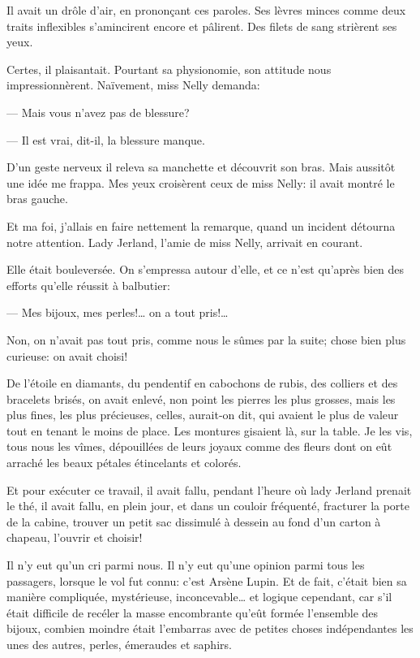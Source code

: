 \documentclass[12pt,a4paper]{article}
\begin{document}
Il avait un drôle d’air, en prononçant ces paroles. Ses lèvres minces comme deux traits inflexibles s’amincirent encore et pâlirent. Des filets de sang strièrent ses yeux.

Certes, il plaisantait. Pourtant sa physionomie, son attitude nous impressionnèrent. Naïvement, miss Nelly demanda:

— Mais vous n’avez pas de blessure?

— Il est vrai, dit-il, la blessure manque.

D’un geste nerveux il releva sa manchette et découvrit son bras. Mais aussitôt une idée me frappa. Mes yeux croisèrent ceux de miss Nelly: il avait montré le bras gauche.

Et ma foi, j’allais en faire nettement la remarque, quand un incident détourna notre attention. Lady Jerland, l’amie de miss Nelly, arrivait en courant.

Elle était bouleversée. On s’empressa autour d’elle, et ce n’est qu’après bien des efforts qu’elle réussit à balbutier:

— Mes bijoux, mes perles!… on a tout pris!…

Non, on n’avait pas tout pris, comme nous le sûmes par la suite; chose bien plus curieuse: on avait choisi!

De l’étoile en diamants, du pendentif en cabochons de rubis, des colliers et des bracelets brisés, on avait enlevé, non point les pierres les plus grosses, mais les plus fines, les plus précieuses, celles, aurait-on dit, qui avaient le plus de valeur tout en tenant le moins de place. Les montures gisaient là, sur la table. Je les vis, tous nous les vîmes, dépouillées de leurs joyaux comme des fleurs dont on eût arraché les beaux pétales étincelants et colorés.

Et pour exécuter ce travail, il avait fallu, pendant l’heure où lady Jerland prenait le thé, il avait fallu, en plein jour, et dans un couloir fréquenté, fracturer la porte de la cabine, trouver un petit sac dissimulé à dessein au fond d’un carton à chapeau, l’ouvrir et choisir!

Il n’y eut qu’un cri parmi nous. Il n’y eut qu’une opinion parmi tous les passagers, lorsque le vol fut connu: c’est Arsène Lupin. Et de fait, c’était bien sa manière compliquée, mystérieuse, inconcevable… et logique cependant, car s’il était difficile de recéler la masse encombrante qu’eût formée l’ensemble des bijoux, combien moindre était l’embarras avec de petites choses indépendantes les unes des autres, perles, émeraudes et saphirs.
\end{document}
